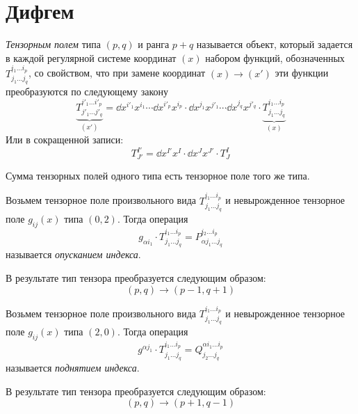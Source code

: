 \documentclass{article}
\begin{document}
\section{Дифгем}
\begin{definition}
    \emph{Тензорным полем} типа $(p, q)$ и ранга $p+q$ называется объект, который задается в каждой регулярной системе координат $(x)$ набором функций, обозначенных $T_{j_1 \ldots j_q}^{i_1 \ldots i_p}$, со свойством, что при замене координат $(x)\to (x')$ эти функции преобразуются по следующему закону
    $$\underbrace{T_{j'_1 \ldots j'_q}^{i'_1 \ldots i'_p}}_{(x')} = \dd{x^{i'_1}}{x^{i_1}} \cdots \dd{x^{i'_p}}{x^{i_p}} \cdot \dd{x^{j_1}}{x^{j'_1}} \cdots \dd{x^{j_q}}{x^{j'_q}} \cdot \underbrace{T_{j_1 \ldots j_q}^{i_1 \ldots i_p}}_{(x)}$$
    Или в сокращенной записи:
    $$T_{J'}^{I'} = \dd{x^{I'}}{x^I} \cdot \dd{x^J}{x^{J'}} \cdot T_J^I$$
\end{definition}

\begin{theorem}
    Сумма тензорных полей одного типа есть тензорное поле того же типа.
\end{theorem}

\begin{definition}
    Возьмем тензорное поле произвольного вида $T_{j_1 \ldots j_q}^{i_1 \ldots i_p}$
    и невырожденное тензорное поле $g_{ij}(x)$ типа $(0,2)$. Тогда операция
    $$g_{\alpha i_1} \cdot T_{j_1 \ldots j_q}^{i_1 \ldots i_p} = P_{\alpha j_1 \ldots j_q}^{i_2 \ldots i_p}$$
    называется \emph{опусканием индекса}.

    В результате тип тензора преобразуется следующим образом:
    $$(p,q) \to (p-1, q+1)$$
\end{definition}

\begin{definition}
    Возьмем тензорное поле произвольного вида $T_{j_1 \ldots j_q}^{i_1 \ldots i_p}$ и невырожденное тензорное поле $g_{ij}(x)$ типа $(2,0)$. Тогда операция
    $$g^{\alpha j_1} \cdot T_{j_1 \ldots j_q}^{i_1 \ldots i_p} = Q_{j_2 \ldots j_q}^{\alpha i_1 \ldots i_p}$$
    называется \emph{поднятием индекса}.

    В результате тип тензора преобразуется следующим образом:
    $$(p,q) \to (p+1, q-1)$$
\end{definition}
\end{document}
